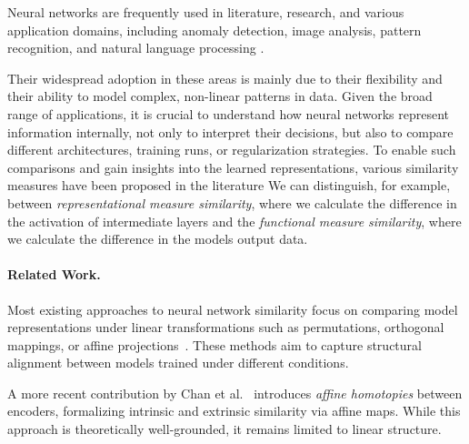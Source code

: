 Neural networks are frequently used in literature, research, and various application domains, including anomaly detection, image analysis, pattern recognition, and natural language processing \cite{pedrycz_deep_2020}.

Their widespread adoption in these areas is mainly due to their flexibility and their ability to model complex, non-linear patterns in data.
Given the broad range of applications, it is crucial to understand how neural networks represent information internally, not only to interpret their decisions, but also to compare different architectures, training runs, or regularization strategies.
To enable such comparisons and gain insights into the learned representations, various similarity measures have been proposed in the literature \cite{klabunde_similarity_2024}
We can distinguish, for example, between \textit{representational measure similarity}, where we calculate the difference in the activation of intermediate layers and the \textit{functional measure similarity}, where we calculate the difference in the models output data. 

\paragraph{Related Work.}
Most existing approaches to neural network similarity focus on comparing model representations under linear transformations such as permutations, orthogonal mappings, or affine projections~\cite{kornblith_similarity_2019, williams_generalized_2021, li_convergent_2016}. 
These methods aim to capture structural alignment between models trained under different conditions.

A more recent contribution by Chan et al.~\cite{chan_affine_2024} introduces \emph{affine homotopies} between encoders, formalizing intrinsic and extrinsic similarity via affine maps.
While this approach is theoretically well-grounded, it remains limited to linear structure.

